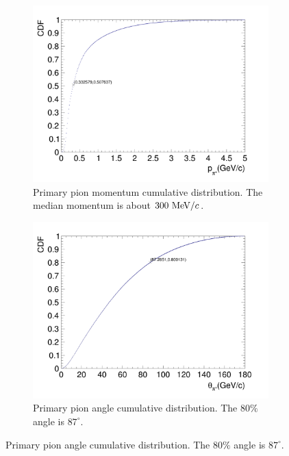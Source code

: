           \begin{figure}[t]
               \centering
               \begin{subfigure}{\dbfigwid\textwidth}
                    \includegraphics[width=\textwidth]{figures/sel/inclusive_pion_mom_CDF_0.5.png}
                    \caption{Primary pion momentum cumulative distribution. The median momentum is about $300~\textrm{MeV}/c$.}
                    \label{subfig:pi-mom-cum}
               \end{subfigure}
               \begin{subfigure}{\dbfigwid\textwidth}
                    \includegraphics[width=\textwidth]{figures/sel/inclusive_pion_theta_CDF_0.8.png}
                    \caption{Primary pion angle cumulative distribution. The $80\%$ angle is $87^\circ$.}
                    \label{subfig:pi-theta-cum}
               \end{subfigure}
          \end{figure}
               

